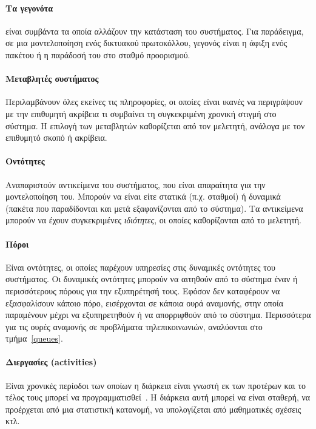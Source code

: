 \documentclass[12pt]{report}
\begin{document}
\paragraph{Τα γεγονότα} είναι συμβάντα τα οποία αλλάζουν την κατάσταση του συστήματος. Για παράδειγμα, σε μια μοντελοποίηση ενός δικτυακού πρωτοκόλλου, γεγονός είναι η άφιξη ενός πακέτου ή η παράδοσή του στο σταθμό προορισμού.

\paragraph{Μεταβλητές συστήματος} Περιλαμβάνουν όλες εκείνες τις πληροφορίες, οι οποίες είναι ικανές να περιγράψουν με την επιθυμητή ακρίβεια τι συμβαίνει τη συγκεκριμένη χρονική στιγμή στο σύστημα. Η επιλογή των μεταβλητών καθορίζεται από τον μελετητή, ανάλογα με τον επιθυμητό σκοπό ή ακρίβεια.

\paragraph{Οντότητες} Αναπαριστούν αντικείμενα του συστήματος, που είναι απαραίτητα για την μοντελοποίηση του. Μπορούν να είναι είτε στατικά (π.χ. σταθμοί) ή δυναμικά (πακέτα που παραδίδονται και μετά εξαφανίζονται από το σύστημα). Τα αντικείμενα μπορούν να έχουν συγκεκριμένες \textit{ιδιότητες}, οι οποίες καθορίζονται από το μελετητή.

\paragraph{Πόροι} Είναι οντότητες, οι οποίες παρέχουν υπηρεσίες στις δυναμικές οντότητες του συστήματος. Οι δυναμικές οντότητες μπορούν να αιτηθούν από το σύστημα έναν ή περισσότερους πόρους για την εξυπηρέτησή τους. Εφόσον δεν καταφέρουν να εξασφαλίσουν κάποιο πόρο, εισέρχονται σε κάποια ουρά αναμονής, στην οποία παραμένουν μέχρι να εξυπηρετηθούν ή να απορριφθούν από το σύστημα. Περισσότερα για τις ουρές αναμονής σε προβλήματα τηλεπικοινωνιών, αναλύονται στο τμήμα~\ref{queues}.

\paragraph{Διεργασίες (\textlatin{activities})} Είναι χρονικές περίοδοι των οποίων η διάρκεια είναι γνωστή εκ των προτέρων και το τέλος τους μπορεί να προγραμματισθεί~\cite{book:04}. Η διάρκεια αυτή μπορεί να είναι σταθερή, να προέρχεται από μια στατιστική κατανομή, να υπολογίζεται από μαθηματικές σχέσεις κτλ.
\end{document}
